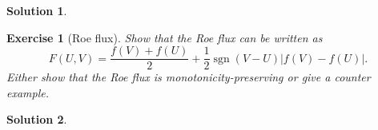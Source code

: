 \documentclass[10pt,letterpaper]{article}
\theoremstyle{break}
\newtheorem{exercise}{Exercise}
\newtheorem{mysolution}{Solution}
\newenvironment{solution}{\begin{mysolution}}{\end{mysolution}}
\begin{document}
\begin{solution}

\end{solution}







\begin{exercise}[Roe flux]
	Show that the Roe flux can be written as 
	\begin{equation}
		F(U,V) = \frac{ f(V) + f(U) }{2} + \frac{1}{2} \operatorname{sgn}( V - U ) |f(V) - f(U)|.
	\end{equation}
	Either show that the Roe flux is monotonicity-preserving or give a counter example. 
\end{exercise}

\begin{solution}

\end{solution}
\end{document}
